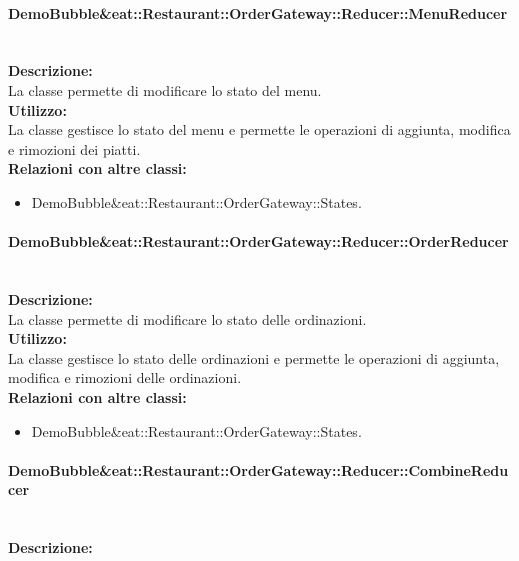 \paragraph{Demo\-Bubble\&eat\-::Restaurant\-::Order\-Gateway\-::Reducer\-::Menu\-Reducer}\label{eat-reducer}\mbox{}\\
\textbf{Descrizione:}\\
La classe permette di modificare lo stato del menu.\\
\textbf{Utilizzo:}\\
La classe gestisce lo stato del menu e permette le operazioni di aggiunta, modifica e rimozioni dei piatti.\\
\textbf{Relazioni con altre classi:}\\
\begin{itemize}
	\item {Demo\-Bubble\&eat\-::Restaurant\-::Order\-Gateway\-::States}.
\end{itemize}

\paragraph{Demo\-Bubble\&eat\-::Restaurant\-::Order\-Gateway\-::Reducer\-::Order\-Reducer}\label{eat-reducer}\mbox{}\\
\textbf{Descrizione:}\\
La classe permette di modificare lo stato delle ordinazioni.\\
\textbf{Utilizzo:}\\
La classe gestisce lo stato delle ordinazioni e permette le operazioni di aggiunta, modifica e rimozioni delle ordinazioni.\\
\textbf{Relazioni con altre classi:}\\
\begin{itemize}
	\item {Demo\-Bubble\&eat\-::Restaurant\-::Order\-Gateway\-::States}.
\end{itemize}

\paragraph{Demo\-Bubble\&eat\-::Restaurant\-::Order\-Gateway\-::Reducer\-::Combine\-Reducer}\label{eat-reducer}\mbox{}\\
\textbf{Descrizione:}\\

